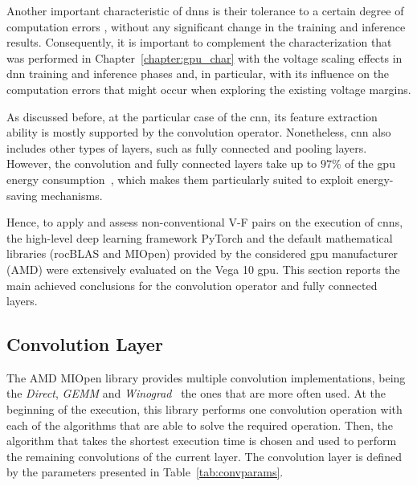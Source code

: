 Another important characteristic of \acrshort{dnn}s is their tolerance to a certain degree of computation errors \cite{zhang_approxann_2015}, without any significant change in the training and inference results. Consequently, it is important to complement the characterization that was performed in Chapter~\ref{chapter:gpu_char} with the voltage scaling effects in \acrshort{dnn} training and inference phases and, in particular, with its influence on the computation errors that might occur when exploring the existing voltage margins.

As discussed before, at the particular case of the \acrshort{cnn}, its feature extraction ability is mostly supported by the convolution operator. Nonetheless, \acrshort{cnn} also includes other types of layers, such as fully connected and pooling layers. However, the convolution and fully connected layers take up to $97\%$ of the \acrshort{gpu} energy consumption~\cite{li_evaluating_2016}, which makes them particularly suited to exploit energy-saving mechanisms. 

Hence, to apply and assess non-conventional V-F pairs on the execution of \acrshort{cnn}s, the high-level deep learning framework PyTorch and the default mathematical libraries (rocBLAS and MIOpen) provided by the considered \acrshort{gpu} manufacturer (AMD) were extensively evaluated on the Vega 10 \acrshort{gpu}. This section reports the main achieved conclusions for the convolution operator and fully connected layers.

\subsection{Convolution Layer}

The AMD MIOpen library provides multiple convolution implementations, being the \textit{Direct}, \textit{GEMM} and \textit{Winograd}~\cite{khan_miopen_2019} the ones that are more often used. 
At the beginning of the execution, this library performs one convolution operation with each of the algorithms that are able to solve the required operation. Then, the algorithm that takes the shortest execution time is chosen and used to perform the remaining convolutions of the current layer. The convolution layer is defined by the parameters presented in Table~\ref{tab:convparams}. 

